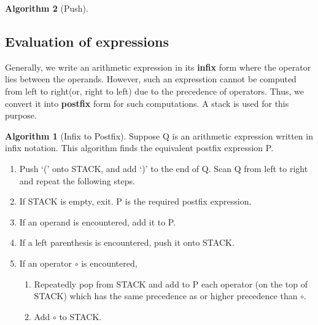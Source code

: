 \documentclass[10pt, a4paper]{extarticle}
\theoremstyle{definition}
\newtheorem{alg}{Algorithm}
\begin{document}
\begin{alg}[Push]
	\subsection{Evaluation of expressions}
	Generally, we write an arithmetic expression in its \textbf{infix} form where the operator lies between the operands. However, such an expresstion cannot be computed from left to right(or, right to left) due to the precedence of operators. Thus, we convert it into \textbf{postfix} form for such computations. A stack is used for this purpose.
	\begin{alg}[Infix to Postfix]
		Suppose Q is an arithmetic expression written in infix notation. This algorithm finds the equivalent postfix expression P.
		\begin{enumerate}
			\item Push `(' onto STACK, and add `)' to the end of Q. Scan Q from left to right and repeat the following steps.
			\item If STACK is empty, exit. P is the required postfix expression.
			\item If an operand is encountered, add it to P.
			\item  If a left parenthesis is encountered, push it onto STACK.
			\item  If an operator $\circ$ is encountered,
				\begin{enumerate}
					\item Repeatedly pop from STACK and add to P each operator (on the top of STACK) which has the same precedence as or higher precedence than $\circ$.
					\item Add $\circ$ to STACK.
			\end{enumerate}
			

\end{enumerate}
\end{alg}
\end{alg}
\end{document}
